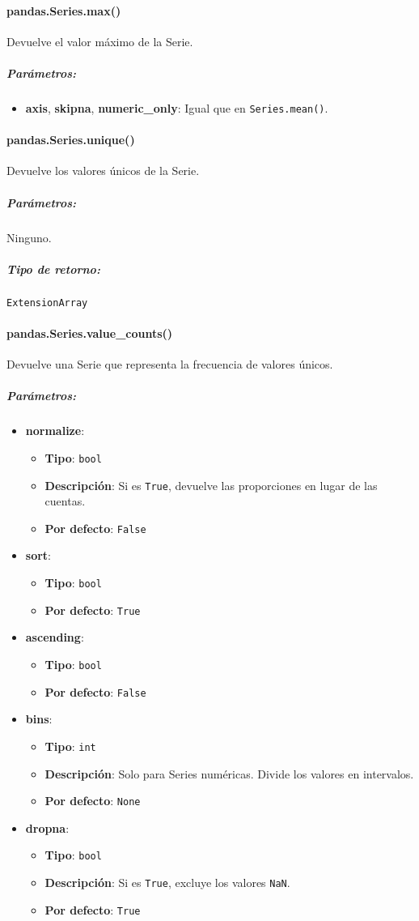 \paragraph{pandas.Series.max()} Devuelve el valor máximo de la Serie.
\subparagraph{Parámetros:}
\begin{itemize}
\item \textbf{axis}, \textbf{skipna}, \textbf{numeric\_only}: Igual que en \texttt{Series.mean()}.
\end{itemize}
\paragraph{pandas.Series.unique()} Devuelve los valores únicos de la Serie.
\subparagraph{Parámetros:} Ninguno.
\subparagraph{Tipo de retorno:} \texttt{ExtensionArray}
\paragraph{pandas.Series.value\_counts()} Devuelve una Serie que representa la frecuencia de valores únicos.
\subparagraph{Parámetros:}
\begin{itemize}
\item \textbf{normalize}:
\begin{itemize}
\item \textbf{Tipo}: \texttt{bool}
\item \textbf{Descripción}: Si es \texttt{True}, devuelve las proporciones en lugar de las cuentas.
\item \textbf{Por defecto}: \texttt{False}
\end{itemize}
\item \textbf{sort}:
\begin{itemize}
\item \textbf{Tipo}: \texttt{bool}
\item \textbf{Por defecto}: \texttt{True}
\end{itemize}
\item \textbf{ascending}:
\begin{itemize}
\item \textbf{Tipo}: \texttt{bool}
\item \textbf{Por defecto}: \texttt{False}
\end{itemize}
\item \textbf{bins}:
\begin{itemize}
\item \textbf{Tipo}: \texttt{int}
\item \textbf{Descripción}: Solo para Series numéricas. Divide los valores en intervalos.
\item \textbf{Por defecto}: \texttt{None}
\end{itemize}
\item \textbf{dropna}:
\begin{itemize}
\item \textbf{Tipo}: \texttt{bool}
\item \textbf{Descripción}: Si es \texttt{True}, excluye los valores \texttt{NaN}.
\item \textbf{Por defecto}: \texttt{True}
\end{itemize}
\end{itemize}
